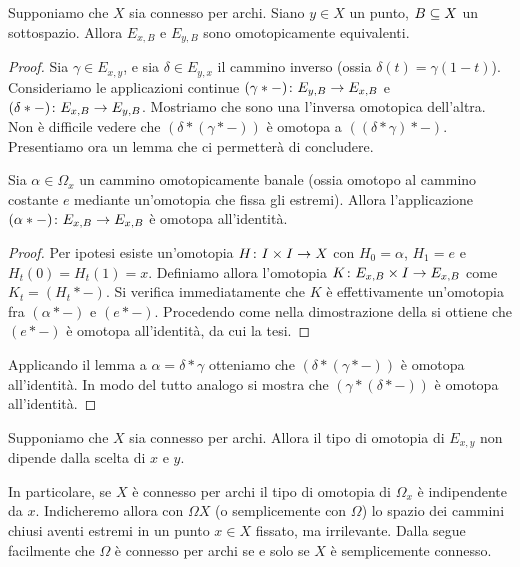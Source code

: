\begin{proposition}
Supponiamo che \(X\) sia connesso per archi. Siano \(y\in X\) un punto, \(B\subseteq X\) un sottospazio. Allora \(E_{x,B}\) e \(E_{y,B}\) sono omotopicamente equivalenti.
\end{proposition}
\begin{proof}
Sia \(\gamma\in E_{x,y}\), e sia \(\delta\in E_{y,x}\) il cammino inverso (ossia \(\delta(t)=\gamma(1-t)\)). Consideriamo le applicazioni continue \(\map{(\gamma\ast-)}{E_{y,B}}{E_{x,B}}\) e \(\map{(\delta\ast-)}{E_{x,B}}{E_{y,B}}\). Mostriamo che sono una l'inversa omotopica dell'altra. Non è difficile vedere che \((\delta\ast(\gamma\ast-))\) è omotopa a \(((\delta\ast\gamma)\ast-)\). Presentiamo ora un lemma che ci permetterà di concludere.
\begin{lemma*}
Sia \(\alpha\in\Omega_x\) un cammino omotopicamente banale (ossia omotopo al cammino costante \(e\) mediante un'omotopia che fissa gli estremi). Allora l'applicazione \(\map{(\alpha\ast-)}{E_{x,B}}{E_{x,B}}\) è omotopa all'identità.
\end{lemma*}
\begin{proof}
Per ipotesi esiste un'omotopia \(\map{H}{I\times I}{X}\) con \(H_0=\alpha\), \(H_1=e\) e \(H_t(0)=H_t(1)=x\). Definiamo allora l'omotopia \(\map{K}{E_{x,B}\times I}{E_{x,B}}\) come \(K_t=(H_t\ast-)\). Si verifica immediatamente che \(K\) è effettivamente un'omotopia fra \((\alpha\ast-)\) e \((e\ast-)\). Procedendo come nella dimostrazione della  si ottiene che \((e\ast-)\) è omotopa all'identità, da cui la tesi.
\end{proof}
Applicando il lemma a \(\alpha=\delta\ast\gamma\) otteniamo che \((\delta\ast(\gamma\ast-))\) è omotopa all'identità. In modo del tutto analogo si mostra che \((\gamma\ast(\delta\ast-))\) è omotopa all'identità.
\end{proof}
\begin{corollary}
Supponiamo che \(X\) sia connesso per archi. Allora il tipo di omotopia di \(E_{x,y}\) non dipende dalla scelta di \(x\) e \(y\).
\end{corollary}
In particolare, se \(X\) è connesso per archi il tipo di omotopia di \(\Omega_x\) è indipendente da \(x\). Indicheremo allora con \(\Omega X\) (o semplicemente con \(\Omega\)) lo spazio dei cammini chiusi aventi estremi in un punto \(x\in X\) fissato, ma irrilevante. Dalla  segue facilmente che \(\Omega\) è connesso per archi se e solo se \(X\) è semplicemente connesso.

